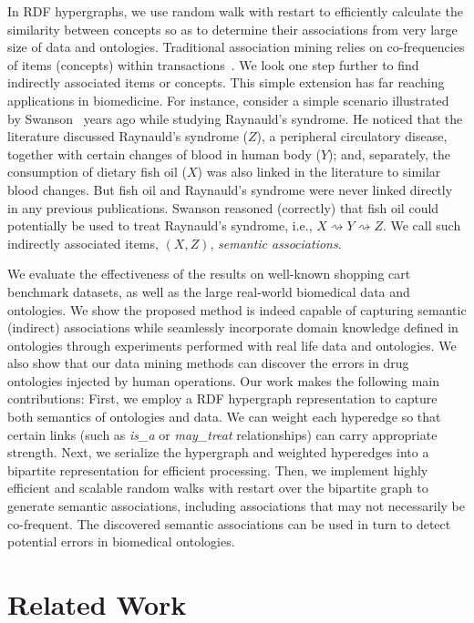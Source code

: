 In RDF hypergraphs, we use random walk with restart to efficiently calculate the similarity between concepts so as to determine their associations from very large size of data and ontologies. Traditional association mining relies on co-frequencies of items (concepts) within transactions~\cite{Agrawal94}. We look one step further to find indirectly associated items or concepts. This simple extension has far reaching applications in biomedicine. For instance, consider a simple scenario illustrated by Swanson~\cite{swanson87} years ago while studying Raynauld's syndrome. He noticed that the literature discussed Raynauld's syndrome ($Z$), a peripheral circulatory disease, together with certain changes of blood in human body ($Y$); and, separately, the consumption of dietary fish oil ($X$) was also linked in the literature to similar blood changes.  But fish oil and Raynauld's syndrome were never linked directly in any previous publications.  Swanson reasoned (correctly) that fish oil could potentially be used to treat Raynauld's syndrome, i.e., $X\rightsquigarrow Y \rightsquigarrow Z$. We call such indirectly associated items, $(X,Z)$, \emph{semantic associations}.

We evaluate the effectiveness of the results on well-known shopping cart benchmark datasets, as well as the large real-world biomedical data and ontologies. We show the proposed method is indeed capable of capturing semantic (indirect) associations while seamlessly incorporate domain knowledge defined in ontologies through experiments performed with real life data and ontologies. We also show that our data mining methods can discover the errors in drug ontologies injected by human operations. Our work makes the following main contributions:  First, we employ a RDF hypergraph representation to capture both semantics of ontologies and data. We can weight each hyperedge so that certain links (such as \emph{is\_a} or \emph{may\_treat} relationships) can carry appropriate strength.  Next, we serialize the hypergraph and weighted hyperedges into a bipartite representation for efficient processing. Then, we implement highly efficient and scalable random walks with restart over the bipartite graph to generate semantic associations, including associations that may not necessarily be co-frequent. The discovered semantic associations can be used in turn to detect potential errors in biomedical ontologies.


\section{Related Work}
